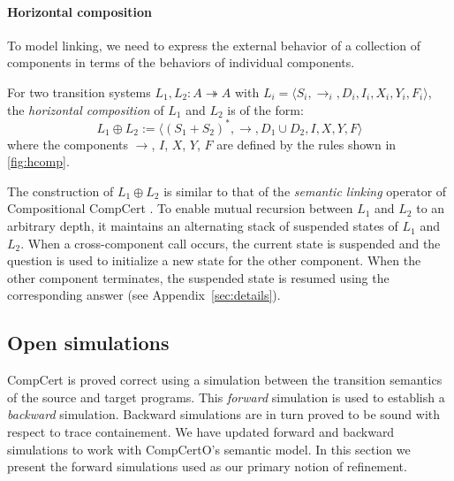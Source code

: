 \documentclass[sigplan,10pt,review]{acmart}
\begin{document}

\paragraph{Horizontal composition} \label{sec:sem:linker} %

To model linking,
we need to express the external behavior
of a collection of components
in terms of the behaviors of
individual components.

\begin{definition} \label{def:hcomp} %
For two transition systems $L_1, L_2 : A \twoheadrightarrow A$
with
$L_i = \langle S_i, {\rightarrow}_i, D_i, I_i, X_i, Y_i, F_i \rangle$,
the \emph{horizontal composition} of $L_1$ and $L_2$
is of the form:
\[
    L_1 \oplus L_2 :=
    \langle
      (S_1 + S_2)^*, {\rightarrow}, D_1 \cup D_2, I, X, Y, F
    \rangle
\]
where the components $\rightarrow$, $I$, $X$, $Y$, $F$
are defined by
the rules shown in \autoref{fig:hcomp}.
\end{definition}

The construction of $L_1 \oplus L_2$
is similar to that of
the \emph{semantic linking} operator of
Compositional CompCert \cite{compcompcert}.
To enable mutual recursion between $L_1$ and $L_2$
to an arbitrary depth,
it maintains an alternating stack of suspended states
of $L_1$ and $L_2$.
When a cross-component call occurs,
the current state is suspended
and the question is used to initialize
a new state for the other component.
When the other component terminates,
the suspended state is resumed
using the corresponding answer
(see Appendix~\ref{sec:details}).



\subsection{Open simulations} \label{sec:sem:ref} %

CompCert is proved correct using a simulation
between the transition semantics of the source and target programs.
This \emph{forward}
simulation is used to establish a \emph{backward} simulation.
Backward simulations
are in turn proved to be sound with respect to trace containement.
We have updated forward and backward simulations to
work with CompCertO's semantic model.
In this section we present the forward simulations
used as our primary notion of refinement.
\end{document}
